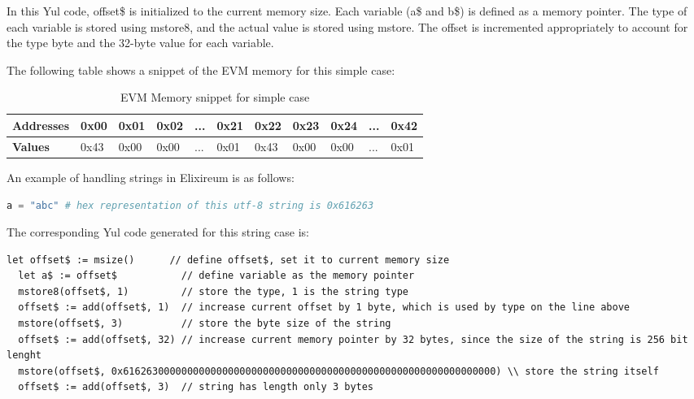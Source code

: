 In this Yul code, offset\$ is initialized to the current memory size. Each variable (a\$ and b\$) is defined as a memory pointer. The type of each variable is stored using mstore8, and the actual value is stored using mstore. The offset is incremented appropriately to account for the type byte and the 32-byte value for each variable.

The following table shows a snippet of the EVM memory for this simple case:

\begin{table}[h!]
  \centering
  \renewcommand{\arraystretch}{1.2} %
  \begin{tabular}{|>{\centering\arraybackslash}m{2cm}|>{\centering\arraybackslash}m{1cm}|>{\centering\arraybackslash}m{1cm}|>{\centering\arraybackslash}m{1cm}|>{\centering\arraybackslash}m{0.75cm}|>{\centering\arraybackslash}m{1cm}|>{\centering\arraybackslash}m{1cm}|>{\centering\arraybackslash}m{1cm}|>{\centering\arraybackslash}m{1cm}|>{\centering\arraybackslash}m{0.75cm}|>{\centering\arraybackslash}m{1cm}|}
  \hline
  \textbf{Addresses} & 0x00 & 0x01 & 0x02 & ... & 0x21 & 0x22 & 0x23 & 0x24 & ... & 0x42 \\ \hline
  \textbf{Values}    & 0x43 & 0x00 & 0x00 & ... & 0x01 & 0x43 & 0x00 & 0x00 & ... & 0x01 \\ \hline
  \end{tabular}
  \caption{EVM Memory snippet for simple case}
  \label{tab:evm_memory}
  \end{table}

An example of handling strings in Elixireum is as follows:

\begin{lstlisting}[caption={Elixireum code for string case}, language=elixir]
  a = "abc" # hex representation of this utf-8 string is 0x616263
\end{lstlisting}
  
The corresponding Yul code generated for this string case is:

\begin{lstlisting}[caption={Generated yul code for string case}, language=yul]
  let offset$ := msize()      // define offset$, set it to current memory size 
  let a$ := offset$           // define variable as the memory pointer
  mstore8(offset$, 1)         // store the type, 1 is the string type
  offset$ := add(offset$, 1)  // increase current offset by 1 byte, which is used by type on the line above
  mstore(offset$, 3)          // store the byte size of the string
  offset$ := add(offset$, 32) // increase current memory pointer by 32 bytes, since the size of the string is 256 bit lenght
  mstore(offset$, 0x6162630000000000000000000000000000000000000000000000000000000000) \\ store the string itself
  offset$ := add(offset$, 3)  // string has length only 3 bytes
\end{lstlisting}

